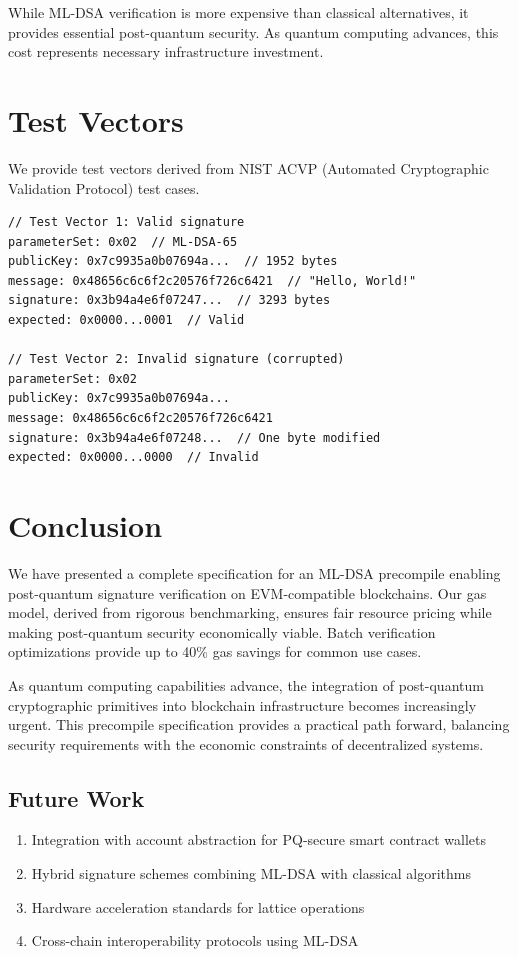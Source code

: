 \documentclass[11pt,a4paper]{article}
\begin{document}
While ML-DSA verification is more expensive than classical alternatives, it provides essential post-quantum security. As quantum computing advances, this cost represents necessary infrastructure investment.

\section{Test Vectors}

We provide test vectors derived from NIST ACVP (Automated Cryptographic Validation Protocol) test cases.

\begin{lstlisting}[caption={ML-DSA-65 Test Vector (truncated)}]
// Test Vector 1: Valid signature
parameterSet: 0x02  // ML-DSA-65
publicKey: 0x7c9935a0b07694a...  // 1952 bytes
message: 0x48656c6c6f2c20576f726c6421  // "Hello, World!"
signature: 0x3b94a4e6f07247...  // 3293 bytes
expected: 0x0000...0001  // Valid

// Test Vector 2: Invalid signature (corrupted)
parameterSet: 0x02
publicKey: 0x7c9935a0b07694a...
message: 0x48656c6c6f2c20576f726c6421
signature: 0x3b94a4e6f07248...  // One byte modified
expected: 0x0000...0000  // Invalid
\end{lstlisting}

\section{Conclusion}

We have presented a complete specification for an ML-DSA precompile enabling post-quantum signature verification on EVM-compatible blockchains. Our gas model, derived from rigorous benchmarking, ensures fair resource pricing while making post-quantum security economically viable. Batch verification optimizations provide up to 40\% gas savings for common use cases.

As quantum computing capabilities advance, the integration of post-quantum cryptographic primitives into blockchain infrastructure becomes increasingly urgent. This precompile specification provides a practical path forward, balancing security requirements with the economic constraints of decentralized systems.

\subsection{Future Work}

\begin{enumerate}
    \item Integration with account abstraction for PQ-secure smart contract wallets
    \item Hybrid signature schemes combining ML-DSA with classical algorithms
    \item Hardware acceleration standards for lattice operations
    \item Cross-chain interoperability protocols using ML-DSA
\end{enumerate}
\end{document}
